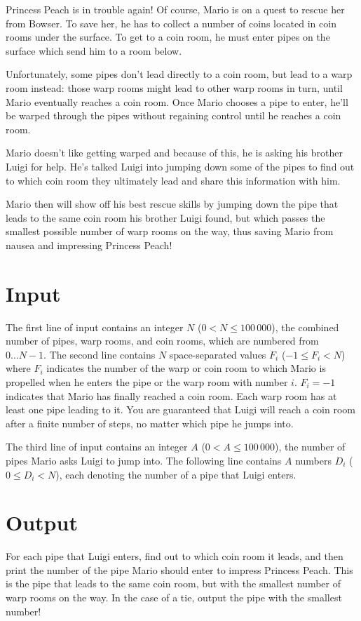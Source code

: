 

Princess Peach is in trouble again! Of course, Mario is on a quest to rescue
her from Bowser.  To save her, he has to collect a number of coins located in
coin rooms under the surface.  To get to a coin room, he must enter pipes on 
the surface which send him to a room below.

Unfortunately, some pipes don't lead directly to a coin room, but lead to a
warp room instead: those warp rooms might lead to other warp rooms in turn,
until Mario eventually reaches a coin room.
Once Mario chooses a pipe to enter, he'll be warped through the pipes
without regaining control until he reaches a coin room.

Mario doesn't like getting warped and because of this, he is asking his 
brother Luigi for help.  He's talked
Luigi into jumping down some of the pipes to find out to which coin room they
ultimately lead and share this information with him.

Mario then will show off his best rescue skills by jumping down the
pipe that leads to the same coin room his brother Luigi found, but which
passes the smallest possible number of warp rooms on the way, thus saving
Mario from nausea and impressing Princess Peach!

\section*{Input}

The first line of input contains an integer $N$ ($0 < N \le 100\,000$), the combined 
number of pipes, warp rooms, and coin rooms, which are numbered from $0 \ldots N-1$. 
The second line contains $N$ space-separated values $F_i$ ($-1 \le F_i < N$)
where $F_i$ indicates the number of the warp or coin room to which Mario
is propelled when he enters the pipe or the warp room with number $i$.
$F_i = -1$ indicates that Mario has finally reached a coin room.
Each warp room has at least one pipe leading to it.
You are guaranteed that Luigi will reach a coin room
after a finite number of steps, no matter which pipe he jumps into.

The third line of input contains an integer $A$ ($0 < A \le 100\,000$), the number of 
pipes Mario asks Luigi to jump into.
The following line contains $A$ numbers $D_i$ ($0 \le D_i < N$), each denoting the
number of a pipe that Luigi enters.

\section*{Output}

For each pipe that Luigi enters, find out to which coin room it leads, and
then print the number of the pipe Mario should enter to impress Princess Peach.  
This is the pipe that leads to the same coin room, but with the smallest number
of warp rooms on the way.  In the case of a tie, output the pipe with the smallest number!


